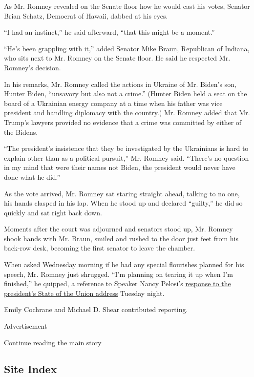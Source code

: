 As Mr. Romney revealed on the Senate floor how he would cast his votes,
Senator Brian Schatz, Democrat of Hawaii, dabbed at his eyes.

``I had an instinct,'' he said afterward, ``that this might be a
moment.''

``He's been grappling with it,'' added Senator Mike Braun, Republican of
Indiana, who sits next to Mr. Romney on the Senate floor. He said he
respected Mr. Romney's decision.

In his remarks, Mr. Romney called the actions in Ukraine of Mr. Biden's
son, Hunter Biden, ``unsavory but also not a crime.'' (Hunter Biden held
a seat on the board of a Ukrainian energy company at a time when his
father was vice president and handling diplomacy with the country.) Mr.
Romney added that Mr. Trump's lawyers provided no evidence that a crime
was committed by either of the Bidens.

``The president's insistence that they be investigated by the Ukrainians
is hard to explain other than as a political pursuit,'' Mr. Romney said.
``There's no question in my mind that were their names not Biden, the
president would never have done what he did.''

As the vote arrived, Mr. Romney sat staring straight ahead, talking to
no one, his hands clasped in his lap. When he stood up and declared
``guilty,'' he did so quickly and sat right back down.

Moments after the court was adjourned and senators stood up, Mr. Romney
shook hands with Mr. Braun, smiled and rushed to the door just feet from
his back-row desk, becoming the first senator to leave the chamber.

When asked Wednesday morning if he had any special flourishes planned
for his speech, Mr. Romney just shrugged. ``I'm planning on tearing it
up when I'm finished,'' he quipped, a reference to Speaker Nancy
Pelosi's
\href{https://www.nytimes.com/2020/02/05/us/politics/trump-pelosi.html}{response
to the president's State of the Union address} Tuesday night.

Emily Cochrane and Michael D. Shear contributed reporting.

Advertisement

\protect\hyperlink{after-bottom}{Continue reading the main story}

\hypertarget{site-index}{%
\subsection{Site Index}\label{site-index}}

